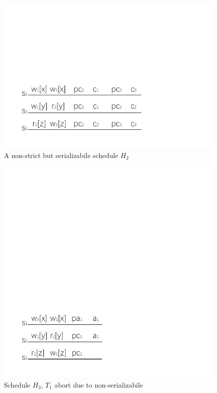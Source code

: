 \documentclass[conference]{IEEEtran}
\begin{document}
\begin{figure}[htbp]
  \centerline{\includegraphics[scale=1]{figure/schedule_non_strict.pdf}}
  \caption{A non-strict but serializabile schedule ${H_2}$}
  \label{fig:non_strict_example}
\end{figure}

\begin{figure}[htbp]
  \centerline{\includegraphics[scale=1]{figure/schedule_not_serializabile.pdf}}
  \caption{Schedule ${H_3}$, ${T_1}$ abort due to non-serializabile}
  \label{fig:schedule_abort_example}
\end{figure}
\end{document}
